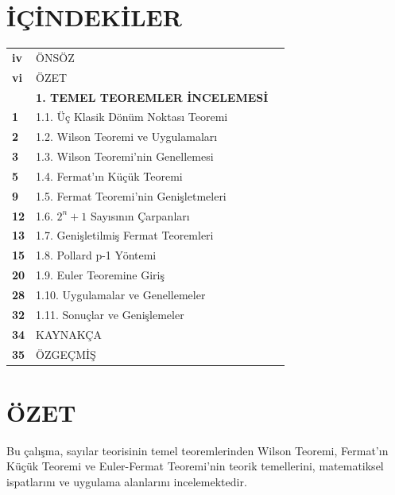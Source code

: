 \clearpage
\section*{İÇİNDEKİLER}
\vspace{1cm}
\begin{tabular}{@{}p{1cm}p{12cm}p{1cm}@{}}
    \textbf{iv} & ÖNSÖZ & \\
    \textbf{vi} & ÖZET & \\
    \textbf{} & \textbf{1. TEMEL TEOREMLER İNCELEMESİ} & \\
    \textbf{1} & \hspace{0.5cm}1.1. Üç Klasik Dönüm Noktası Teoremi & \\
    \textbf{2} & \hspace{0.5cm}1.2. Wilson Teoremi ve Uygulamaları & \\
    \textbf{3} & \hspace{0.5cm}1.3. Wilson Teoremi'nin Genellemesi & \\
    \textbf{5} & \hspace{0.5cm}1.4. Fermat'ın Küçük Teoremi & \\
    \textbf{9} & \hspace{0.5cm}1.5. Fermat Teoremi'nin Genişletmeleri & \\
    \textbf{12} & \hspace{0.5cm}1.6. $2^n + 1$ Sayısının Çarpanları & \\
    \textbf{13} & \hspace{0.5cm}1.7. Genişletilmiş Fermat Teoremleri & \\
    \textbf{15} & \hspace{0.5cm}1.8. Pollard p-1 Yöntemi & \\
    \textbf{20} & \hspace{0.5cm}1.9. Euler Teoremine Giriş & \\
    \textbf{28} & \hspace{0.5cm}1.10. Uygulamalar ve Genellemeler & \\
    \textbf{32} & \hspace{0.5cm}1.11. Sonuçlar ve Genişlemeler & \\
    \textbf{34} & KAYNAKÇA & \\
    \textbf{35} & ÖZGEÇMİŞ & \\
\end{tabular}

\clearpage
\section*{ÖZET}
\vspace{1cm}
Bu çalışma, sayılar teorisinin temel teoremlerinden Wilson Teoremi, Fermat'ın Küçük Teoremi ve Euler-Fermat Teoremi'nin teorik temellerini, matematiksel ispatlarını ve uygulama alanlarını incelemektedir.

